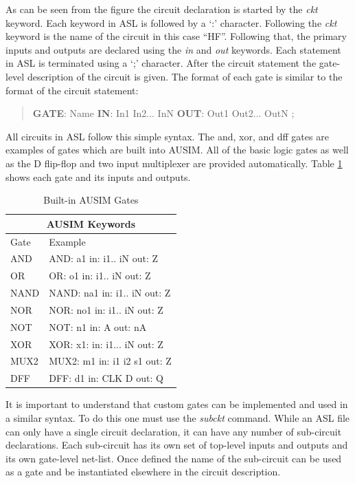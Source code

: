 \documentclass[12pt]{report}
\begin{document}
As can be seen from the figure the circuit declaration is started by the \textit{ckt} keyword.  Each keyword in ASL is followed by a `:' character.  Following the \textit{ckt} keyword is the name of the circuit in this case ``HF''.  Following that, the primary inputs and outputs are declared using the \textit{in} and \textit{out} keywords.  Each statement in ASL is terminated using a `;' character.  After the circuit statement the gate-level description of the circuit is given.  The format of each gate is similar to the format of the circuit statement:
\begin{quote}
	\textbf{GATE}: Name \textbf{IN}: In1 In2... InN \textbf{OUT}: Out1 Out2... OutN ;\cite{asl}
\end{quote}
All circuits in ASL follow this simple syntax.  The and, xor, and dff gates are examples of gates which are built into AUSIM.  All of the basic logic gates as well as the D flip-flop and two input multiplexer are provided automatically.  Table \ref{tbl:ASLGates} shows each gate and its inputs and outputs.
\begin{table}[bht]
\begin{center}
\begin{tabular}{|l|l|}
\hline
\multicolumn{2}{|c|}{AUSIM Keywords} \\ \hline
Gate & Example \\ \hline
AND & AND: a1 in: i1.. iN out: Z \\ \hline
OR & OR: o1 in: i1.. iN out: Z \\ \hline
NAND & NAND: na1 in: i1.. iN out: Z \\ \hline
NOR & NOR: no1 in: i1.. iN out: Z \\ \hline
NOT & NOT: n1 in: A out: nA \\ \hline
XOR & XOR: x1: in: i1... iN out: Z \\ \hline
MUX2 & MUX2: m1 in: i1 i2 s1 out: Z \\ \hline
DFF & DFF: d1 in: CLK D out: Q \\ \hline
\end{tabular}
\end{center}
\caption{Built-in AUSIM Gates\cite{asl}}
\label{tbl:ASLGates}
\end{table}

It is important to understand that custom gates can be implemented and used in a similar syntax.  To do this one must use the \textit{subckt} command.  While an ASL file can only have a single circuit declaration, it can have any number of sub-circuit declarations\cite{asl}.  Each sub-circuit has its own set of top-level inputs and outputs and its own gate-level net-list.  Once defined the name of the sub-circuit can be used as a gate and be instantiated elsewhere in the circuit description.  
\end{document}
